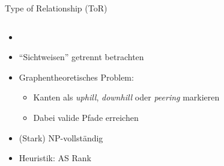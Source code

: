 \documentclass[ngerman,compress,hyperref={bookmarks}]{beamer}
\begin{document}
\begin{frame}{Type of Relationship (ToR)}
 \begin{columns}[c]
  \begin{column}{0.5\textwidth}
   \begin{itemize}
    \item \cite{Subramanian:2001:CIH:894120, Di_Battista:2007:CTR:1279660.1279662}
    \item ``Sichtweisen'' getrennt betrachten
    \item Graphentheoretisches Problem:
    \begin{itemize}
     \item Kanten als \emph{uphill}, \emph{downhill} oder \emph{peering} markieren
     \item Dabei valide Pfade erreichen
    \end{itemize}
    \item (Stark) NP-vollständig
    \item Heuristik: AS Rank
   \end{itemize}

  \end{column}
  \begin{column}{0.1\textwidth}

  \end{column}
  \begin{column}{0.3\textwidth}

  \end{column}
 \end{columns}

\end{frame}
\end{document}
